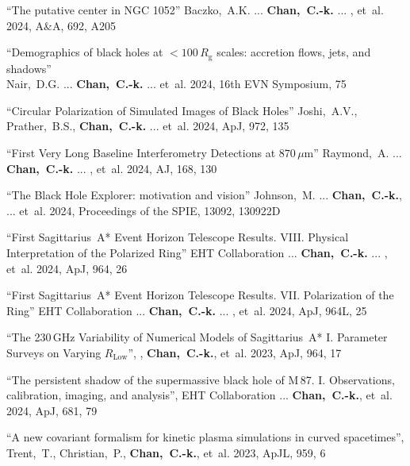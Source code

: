\begin{ilist}
\item ``The putative center in NGC 1052''
  Baczko,~A.K. ... \textbf{Chan,~C.-k.} ... , et~al.
  2024, A\&A, 692, A205

\item ``Demographics of black holes at $< 100\,R_\mathrm{g}$ scales: accretion flows, jets, and shadows''\\
  Nair,~D.G. ... \textbf{Chan,~C.-k.} ... et~al.
  2024, 16th EVN Symposium, 75

\item ``Circular Polarization of Simulated Images of Black Holes''
  Joshi,~A.V., Prather,~B.S., \textbf{Chan,~C.-k.} ... et~al.
  2024, ApJ, 972, 135

\item ``First Very Long Baseline Interferometry Detections at $870\,\mu\mathrm{m}$''
  Raymond,~A. ...\\ \textbf{Chan,~C.-k.} ... , et~al.
  2024, AJ, 168, 130

\item ``The Black Hole Explorer: motivation and vision''
  Johnson,~M. ... \textbf{Chan,~C.-k.}, ... et~al.
  2024, Proceedings of the SPIE, 13092, 130922D

\item ``First Sagittarius~A* Event Horizon Telescope Results. VIII. Physical Interpretation of the Polarized Ring''
  EHT Collaboration ... \textbf{Chan,~C.-k.} ... , et~al.
  2024, ApJ, 964, 26

\item ``First Sagittarius~A* Event Horizon Telescope Results. VII. Polarization of the Ring''
  EHT Collaboration ... \textbf{Chan,~C.-k.} ... , et~al.
  2024, ApJ, 964L, 25

\item ``The 230\,GHz Variability of Numerical Models of Sagittarius~A* I. Parameter Surveys on Varying $R_\mathrm{Low}$'',
  , \textbf{Chan,~C.-k.}, et~al.
  2023, ApJ, 964, 17

\item ``The persistent shadow of the supermassive black hole of M\,87. I. Observations, calibration, imaging, and analysis'',
  EHT Collaboration ... \textbf{Chan,~C.-k.}, et~al.
  2024, ApJ, 681, 79

\item ``A new covariant formalism for kinetic plasma simulations in curved spacetimes'',
  Trent,~T., Christian,~P., \textbf{Chan,~C.-k.}, et~al.
  2023, ApJL, 959, 6


\end{ilist}
